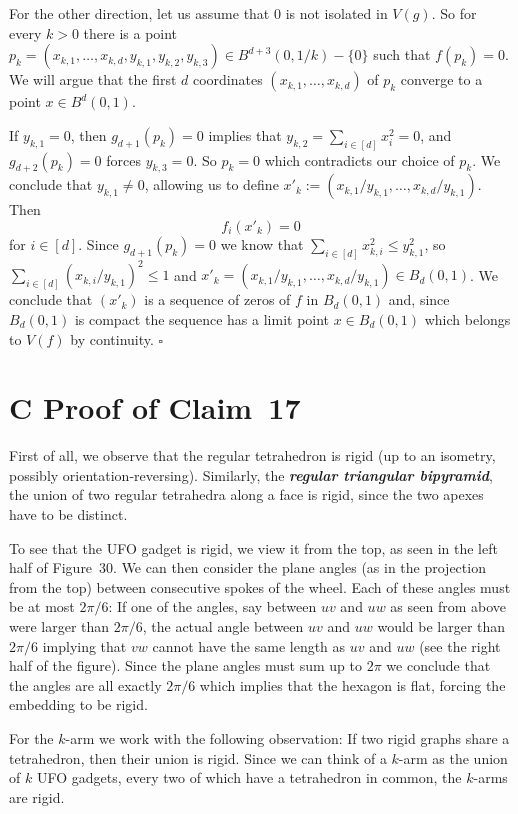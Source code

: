 \documentclass{article}
\newcommand{\defn}[1]{\textit{\textbf{\boldmath #1}}}
\begin{document}
For the other direction, let us assume that $0$ is not isolated in $V(g)$. So for every $k > 0$ there is a point $p_k = (x_{k,1},\ldots, x_{k,d},y_{k,1}, y_{k,2}, y_{k,3}) \in B^{d+3}(0,1/k) -\{0\}$ such that $f(p_k) = 0$. We will argue that the first $d$ coordinates $(x_{k,1},\ldots, x_{k,d})$ of $p_k$ converge to a point $x \in B^d(0,1)$. 

If  $y_{k,1} = 0$, then $g_{d+1}(p_k) = 0$ implies that $y_{k,2} = \sum_{i \in [d]} x_i^2 = 0$, and $g_{d+2}(p_k) = 0$ forces $y_{k,3} = 0$. So $p_k = 0$ which contradicts our choice of $p_k$. We conclude that $y_{k,1} \neq 0$, allowing
us to define $x'_k := (x_{k,1}/y_{k,1}, \ldots, x_{k,d}/y_{k,1})$.
Then
\[f_i(x'_k) = 0\]
for $i \in [d]$. Since $g_{d+1}(p_k) = 0$ we know that
$\sum_{i \in [d]}x_{k,i}^2 \leq y_{k,1}^2$, so $\sum_{i \in [d]}(x_{k,i}/y_{k,1})^2 \leq 1$ and $x'_k = (x_{k,1}/y_{k,1}, \ldots, x_{k,d}/y_{k,1}) \in B_d(0,1)$. We conclude that $(x'_k)$ is a sequence of zeros of $f$ in $B_d(0,1)$ and, since $B_d(0,1)$ is compact the sequence has a limit point $x \in B_d(0,1)$ which belongs to $V(f)$ by continuity.
\hfill$\square$\par\medskip

\section*{C Proof of Claim~17}

 First of all, we observe that the regular tetrahedron is rigid (up to an isometry, possibly orientation-reversing). Similarly, the \defn{regular triangular bipyramid}, the union of two regular tetrahedra along a face is rigid, since the two apexes have to be distinct. 

 To see that the UFO gadget is rigid, we view it from the top, as seen in the left half of Figure~30. We can then consider the plane angles (as in the projection from the top) between consecutive spokes of the wheel. Each of these angles must be at most $2\pi/6$: If one of the angles, say between $uv$ and $uw$ as seen from above were larger than $2\pi/6$, the actual angle between $uv$ and $uw$ would be larger than $2\pi/6$ implying that $vw$ cannot have the same length as $uv$ and $uw$ (see the right half of the figure). Since the plane angles must sum up to $2\pi$ we conclude that the angles are all exactly $2\pi/6$ which implies that the hexagon is flat, forcing the embedding to be rigid. 

 For the $k$-arm we work with the following observation: If two rigid graphs share a tetrahedron, then their union is rigid. Since we can think of a $k$-arm as the union of $k$ UFO gadgets, every two of which have a tetrahedron in common, the $k$-arms are rigid.
\end{document}

